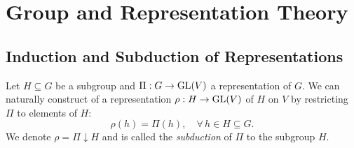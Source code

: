 \documentclass[12pt]{report}
\begin{document}
\section{Group and Representation Theory} \label{sec:grouptheory}

\subsection{Induction and Subduction of Representations} \label{subsec:induction_subduction}

\begin{definition} \label{def:subduction_defi}
Let $H \subseteq G$ be a subgroup and $\Pi: G \to {\text{GL}}(V)$ a representation of $G$. We can naturally construct of a representation $\rho: H \to {\text{GL}}(V)$ of $H$ on $V$ by restricting $\Pi$ to elements of $H$:
\begin{equation} \label{eq:subduction_defi}
\rho(h) = \Pi(h), \quad \forall \, h \in H \subseteq G.
\end{equation}
We denote $\rho = \Pi \downarrow H$ and is called the \textit{subduction} of $\Pi$ to the subgroup $H$.
\end{definition}
\end{document}
